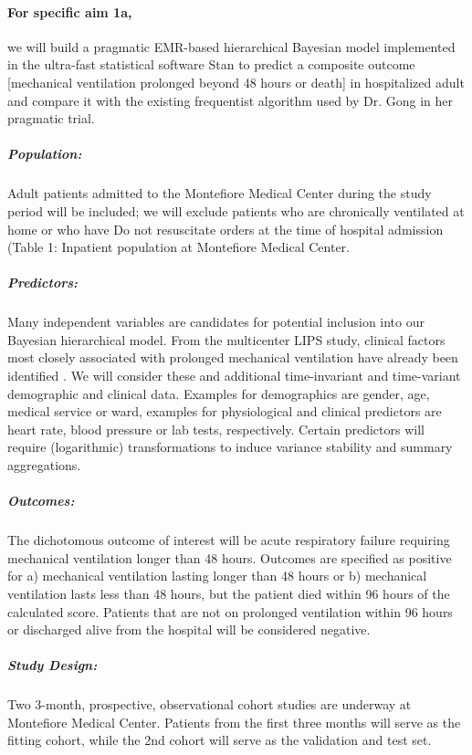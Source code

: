 \documentclass[11pt,notitlepage]{article}
\begin{document}
\paragraph*{For specific aim 1a,} we will build a pragmatic EMR-based hierarchical Bayesian model implemented in the ultra-fast statistical software Stan to predict a composite outcome [mechanical ventilation prolonged beyond 48 hours or death] in hospitalized adult and compare it with the existing frequentist algorithm used by Dr. Gong in her pragmatic trial.

\subparagraph*{Population:}
Adult patients admitted to the Montefiore Medical Center during the study period will be included; we will exclude patients who are chronically ventilated at home or who have Do not resuscitate orders at the time of hospital admission (Table 1: Inpatient population at Montefiore Medical Center. 

\subparagraph*{Predictors:}
Many independent variables are candidates for potential inclusion into our Bayesian hierarchical model. From the multicenter LIPS study, clinical factors most closely associated with prolonged mechanical ventilation have already been identified \cite{Herridge_12594312}. We will consider these and additional time-invariant and time-variant demographic and clinical data. Examples for demographics are gender, age, medical service or ward, examples for physiological and clinical predictors are heart rate, blood pressure or lab tests, respectively. Certain predictors will require (logarithmic) transformations to induce variance stability and summary aggregations.

\subparagraph*{Outcomes:}
The dichotomous outcome of interest will be acute respiratory failure requiring mechanical ventilation longer than 48 hours. Outcomes are specified as positive for a) mechanical ventilation lasting longer than 48 hours or b) mechanical ventilation lasts less than 48 hours, but the patient died within 96 hours of the calculated score. Patients that are not on prolonged ventilation within 96 hours or discharged alive from the hospital will be considered negative.

\subparagraph*{Study Design:}
Two 3-month, prospective, observational cohort studies are underway at Montefiore Medical Center. Patients from the first three months will serve as the fitting cohort, while the 2nd cohort will serve as the validation and test set.
\end{document}
